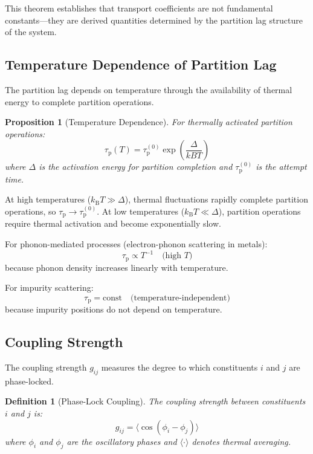 \documentclass[twocolumn,10pt,aps,prd,superscriptaddress,nofootinbib]{revtex4-2}
\newtheorem{proposition}[theorem]{Proposition}
\newtheorem{definition}[theorem]{Definition}
\theoremstyle{remark}
\newcommand{\kB}{k_{\mathrm{B}}}
\newcommand{\tauP}{\tau_{\mathrm{p}}}
\newcommand{\Gij}{g_{ij}}
\begin{document}
This theorem establishes that transport coefficients are not fundamental constants---they are derived quantities determined by the partition lag structure of the system.

\subsection{Temperature Dependence of Partition Lag}

The partition lag depends on temperature through the availability of thermal energy to complete partition operations.

\begin{proposition}[Temperature Dependence]
\label{prop:temperature_dependence}
For thermally activated partition operations:
\begin{equation}
\tauP(T) = \tauP^{(0)} \exp\left(\frac{\Delta}{kB T}\right)
\label{eq:temperature_dependence}
\end{equation}
where $\Delta$ is the activation energy for partition completion and $\tauP^{(0)}$ is the attempt time.
\end{proposition}

At high temperatures ($\kB T \gg \Delta$), thermal fluctuations rapidly complete partition operations, so $\tauP \to \tauP^{(0)}$. At low temperatures ($\kB T \ll \Delta$), partition operations require thermal activation and become exponentially slow.

For phonon-mediated processes (electron-phonon scattering in metals):
\begin{equation}
\tauP \propto T^{-1} \quad \text{(high } T\text{)}
\label{eq:phonon_lag}
\end{equation}
because phonon density increases linearly with temperature.

For impurity scattering:
\begin{equation}
\tauP = \text{const} \quad \text{(temperature-independent)}
\label{eq:impurity_lag}
\end{equation}
because impurity positions do not depend on temperature.

\subsection{Coupling Strength}

The coupling strength $\Gij$ measures the degree to which constituents $i$ and $j$ are phase-locked.

\begin{definition}[Phase-Lock Coupling]
\label{def:coupling}
The coupling strength between constituents $i$ and $j$ is:
\begin{equation}
\Gij = \langle \cos(\phi_i - \phi_j) \rangle
\label{eq:coupling_definition}
\end{equation}
where $\phi_i$ and $\phi_j$ are the oscillatory phases and $\langle \cdot \rangle$ denotes thermal averaging.
\end{definition}
\end{document}
